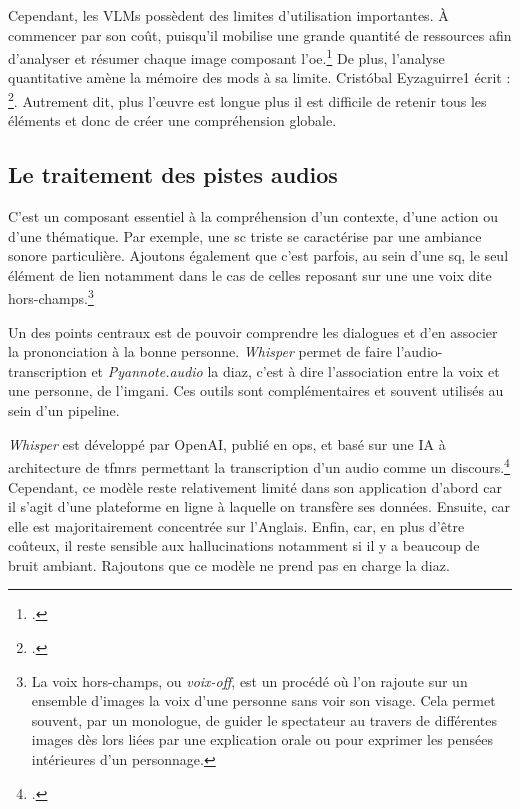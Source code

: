 Cependant, les \glspl{VLM} possèdent des limites d'utilisation importantes. À commencer par son coût, puisqu'il mobilise une grande quantité de ressources afin d'analyser et résumer chaque image composant l'\gls{oe}.\footcite[p.2]{eyzaguirreLinearScalingVideo2026} De plus, l'analyse quantitative amène la mémoire des \glspl{mod} à sa limite. Cristóbal Eyzaguirre1 écrit : \footcite[p.2]{eyzaguirreLinearScalingVideo2026}. Autrement dit, plus l'\oe{uvre} est longue plus il est difficile de retenir tous les éléments et donc de créer une compréhension globale.

\subsection{Le traitement des pistes audios}
  
C'est un composant essentiel à la compréhension d'un contexte, d'une action ou d'une thématique. Par exemple, une \gls{sc} triste se caractérise par une ambiance sonore particulière. Ajoutons également que c'est parfois, au sein d'une \gls{sq}, le seul élément de lien notamment dans le cas de celles reposant sur une une voix dite hors-champs.\footnote{La voix hors-champs, ou \textit{voix-off}, est un procédé où l'on rajoute sur un ensemble d'images la voix d'une personne sans voir son visage. Cela permet souvent, par un monologue, de guider le spectateur au travers de différentes images dès lors liées par une explication orale ou pour exprimer les pensées intérieures d'un personnage.}

Un des points centraux est de pouvoir comprendre les dialogues et d'en associer la prononciation à la bonne personne. \textit{Whisper} permet de faire l'audio-transcription et \textit{Pyannote.audio} la \gls{diaz}, c'est à dire l'association entre la voix et une personne, de l'\gls{imgani}. Ces outils sont complémentaires et souvent utilisés au sein d'un pipeline.\newline

\textit{Whisper} est développé par OpenAI, publié en \gls{ops}, et basé sur une \gls{IA} à architecture de \gls{tfmrs} permettant la transcription d'un audio comme un discours.\footcite{radfordRobustSpeechRecognition} Cependant, ce modèle reste relativement limité dans son application d'abord car il s'agit d'une plateforme en ligne à laquelle on transfère ses données. Ensuite, car elle est majoritairement concentrée sur l'Anglais. Enfin, car, en plus d'être coûteux, il reste sensible aux hallucinations notamment si il y a beaucoup de bruit ambiant. Rajoutons que ce modèle ne prend pas en charge la \gls{diaz}.

